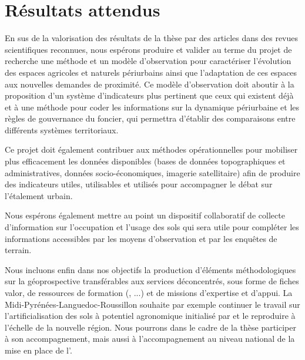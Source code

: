 \page[yes]
\section[resultats]{Résultats attendus}

En sus de la valorisation des résultats de la thèse
par des articles dans des revues scientifiques reconnues,
nous espérons produire et valider au terme du projet de recherche
une méthode et un modèle d'observation pour caractériser l'évolution des espaces agricoles et
naturels périurbains ainsi que l'adaptation de ces espaces aux nouvelles demandes de proximité.
Ce modèle d'observation doit aboutir à la proposition d'un système d'indicateurs
plus pertinent que ceux qui existent déjà
et à une méthode pour coder les informations sur la dynamique périurbaine
et les règles de gouvernance du foncier,
qui permettra d'établir des comparaisons entre différents systèmes territoriaux.

Ce projet doit également contribuer aux méthodes opérationnelles
pour mobiliser plus efficacement les données disponibles
(bases de données topographiques et administratives, données socio-économiques, imagerie
satellitaire) afin de produire des indicateurs utiles, utilisables et utilisés
pour accompagner le débat sur l'étalement urbain.

Nous espérons également mettre au point un dispositif collaboratif
de collecte d'information sur l'occupation et l'usage des sols
qui sera utile pour compléter les informations accessibles par les moyens
d'observation et par les enquêtes de terrain.

Nous incluons enfin dans nos objectifs la production d'éléments méthodologiques
sur la géoprospective transférables aux services déconcentrés, sous forme de fiches {\sc valor},
de ressources de formation ({\FOAD}, ...) et de missions d’expertise et d’appui.
La {\DRAAF} Midi-Pyrénées-Languedoc-Roussillon souhaite par exemple
continuer le travail sur l'artificialisation des sols à potentiel agronomique
initialisé par \citet{balestrat_reconnaissance_2011} et
le reproduire à l'échelle de la nouvelle région.
Nous pourrons dans le cadre de la thèse participer à son accompagnement,
mais aussi à l'accompagnement au niveau national de la mise en place de l'{\OENAF}.